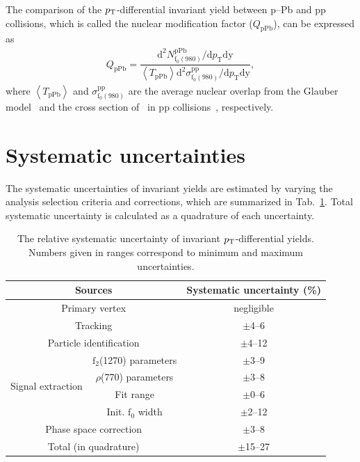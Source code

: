  
The comparison of the $p_{\rm{T}}$-differential invariant yield between p--Pb and pp collisions, which is called the nuclear modification factor ($Q_{\mathrm{pPb}}$), can be expressed as
\begin{eqnarray}
Q_{\mathrm{pPb}} = \dfrac{\mathrm{d}^{2} N_{\mathrm{f}_{0}(980)}^{\mathrm{pPb}} / \mathrm{d} p_{\mathrm{T}} \mathrm{dy} }{ \left\langle T_{\mathrm{pPb}} \right\rangle \mathrm{d}^{2} \sigma_{\mathrm{f}_{0}(980)}^{\mathrm{pp}}/ \mathrm{d} p_{\mathrm{T}} \mathrm{dy} },
\end{eqnarray}
where $\left\langle T_{\mathrm{pPb}} \right\rangle$ and $\sigma_{\mathrm{f}_{0}(980)}^{\mathrm{pp}}$ are the average nuclear overlap from the Glauber model~\cite{Miller:2007ri} and the cross section of \fzero~in pp collisions~\cite{ALICE:2022qnb}, respectively.

\section{Systematic uncertainties}
\label{sec:syst}
The systematic uncertainties of invariant yields are estimated by varying the analysis selection criteria and corrections, which are summarized in Tab.~\ref{tab:syst}. Total systematic uncertainty is calculated as a quadrature of each uncertainty. 

\begin{table}[h!]
\caption{The relative systematic uncertainty of invariant $p_{\rm{T}}$-differential yields. Numbers given in ranges correspond to minimum and maximum uncertainties.}
\centering
\begin{tabular}{cc|c}
\hline 
\multicolumn{2}{c|}{Sources}  &Systematic uncertainty (\%) \\ \hline
\multicolumn{2}{c|}{Primary vertex} & negligible \\ 
\multicolumn{2}{c|}{Tracking} & $\pm$4--6 \\
\multicolumn{2}{c|}{Particle identification} & $\pm$4--12 \\ 
\multirow{4}{*}{Signal extraction} &  $\mathrm{f}_{2}$(1270) parameters	& $\pm$3--9 \\ 
& $\rho$(770) parameters & $\pm$3--8 \\
& Fit range & $\pm$0--6 \\
& Init. $\mathrm{f}_{0}$ width & $\pm$2--12 \\
\multicolumn{2}{c|}{Phase space correction} & $\pm$3--8 \\ \hline 
\multicolumn{2}{c|}{Total (in quadrature)}	& $\pm$15--27 \\ 
\hline 
\end{tabular}
\label{tab:syst}
\end{table}

